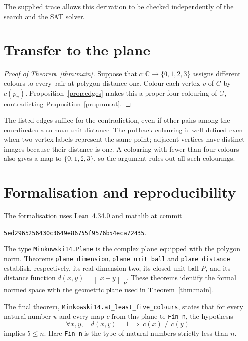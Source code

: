 \documentclass[11pt,a4paper]{article}
\theoremstyle{remark}
\newcommand{\C}{\mathbb C}
\newcommand{\pn}[1]{\left\lVert #1\right\rVert_{P}}
\newcommand{\code}[1]{\texttt{#1}}
\begin{document}
The supplied trace allows this derivation to be checked independently
of the search and the SAT solver.

\section{Transfer to the plane}\label{sec:transfer}

\begin{proof}[Proof of Theorem~\ref{thm:main}]
Suppose that $c:\C\to\{0,1,2,3\}$ assigns different colours to every
pair at polygon distance one. Colour each vertex $v$ of $G$ by $c(p_v)$.
Proposition~\ref{prop:edges} makes this a proper four-colouring of $G$,
contradicting Proposition~\ref{prop:unsat}.
\end{proof}

The listed edges suffice for the contradiction, even if other pairs
among the coordinates also have unit distance. The pullback colouring
is well defined even when two vertex labels represent the same point;
adjacent vertices have distinct images because their distance is one.
A colouring with fewer than four colours also gives a map to
$\{0,1,2,3\}$, so the argument rules out all such colourings.

\section{Formalisation and reproducibility}\label{sec:formal}

The formalisation uses Lean~4.34.0 and mathlib at commit
\begin{center}\small\code{5ed2965256430c3649e86755f9576b54eca72435}.\end{center}
The type \code{Minkowski14.Plane} is the complex plane equipped with the
polygon norm. Theorems \code{plane\_dimension}, \code{plane\_unit\_ball}
and \code{plane\_distance} establish, respectively, its real dimension
two, its closed unit ball $P$, and its distance function
$d(x,y)=\pn{x-y}$. These theorems identify the formal normed space with
the geometric plane used in Theorem~\ref{thm:main}.

The final theorem, \code{Minkowski14.at\_least\_five\_colours}, states
that for every natural number $n$ and every map $c$ from this plane to
\code{Fin n}, the hypothesis
\[
 \forall x,y,\quad d(x,y)=1\ \Longrightarrow\ c(x)\neq c(y)
\]
implies $5\leq n$. Here \code{Fin n} is the type of natural numbers
strictly less than $n$.
\end{document}
